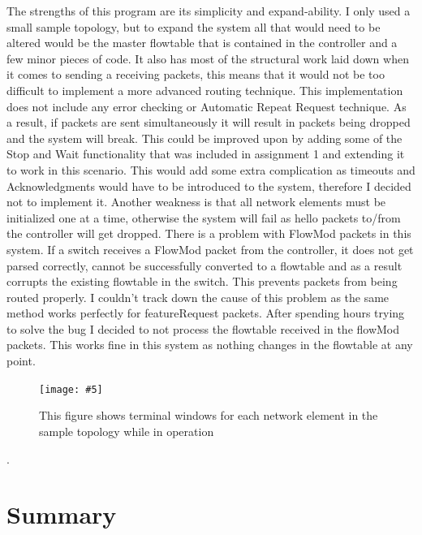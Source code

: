 \documentclass{article}
\newcommand{\includescalefigure}[5]{
\begin{figure}[htb]
\centering
\texttt{[image: \#5]}
\captionsetup{width=.8\linewidth} 
\caption[#2]{#3}
\label{#1}
\end{figure}
}
\begin{document}
The strengths of this program are its simplicity and expand-ability. I only used a small sample topology, but to expand the system all that would need to be altered would be the master flowtable that is contained in the controller and a few minor pieces of code. It also has most of the structural work laid down when it comes to sending a receiving packets, this means that it would not be too difficult to implement a more advanced routing technique. 
\newline
\newline
This implementation does not include any error checking or Automatic Repeat Request technique. As a result, if packets are sent simultaneously it will result in packets being dropped and the system will break. This could be improved upon by adding some of the Stop and Wait functionality that was included in assignment 1 and extending it to work in this scenario. This would add some extra complication as timeouts and Acknowledgments would have to be introduced to the system, therefore I decided not to implement it.
\newline
\newline
Another weakness is that all network elements must be initialized one at a time, otherwise the system will fail as hello packets to/from the controller will get dropped.
\newline
\newline
There is a problem with FlowMod packets in this system. If a switch receives a FlowMod packet from the controller, it does not get parsed correctly, cannot be successfully converted to a flowtable and as a result corrupts the existing flowtable in the switch. This prevents packets from being routed properly. I couldn't track down the cause of this problem as the same method works perfectly for featureRequest packets. After spending hours trying to solve the bug I decided to not process the flowtable received in the flowMod packets. This works fine in this system as nothing changes in the flowtable at any point.

\includescalefigure{ProgramFlow}{Showing program in operation}{This figure shows terminal windows for each network element in the sample topology while in operation}{1}{ProgramFlow.png}.


\section{Summary}
\end{document}
